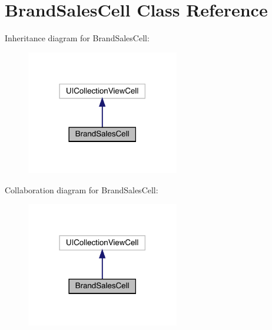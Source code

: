 \hypertarget{interface_brand_sales_cell}{}\section{Brand\+Sales\+Cell Class Reference}
\label{interface_brand_sales_cell}


Inheritance diagram for Brand\+Sales\+Cell\+:\nopagebreak
\begin{figure}[H]
\begin{center}
\leavevmode
\includegraphics[width=189pt]{interface_brand_sales_cell__inherit__graph}
\end{center}
\end{figure}


Collaboration diagram for Brand\+Sales\+Cell\+:\nopagebreak
\begin{figure}[H]
\begin{center}
\leavevmode
\includegraphics[width=189pt]{interface_brand_sales_cell__coll__graph}
\end{center}
\end{figure}

